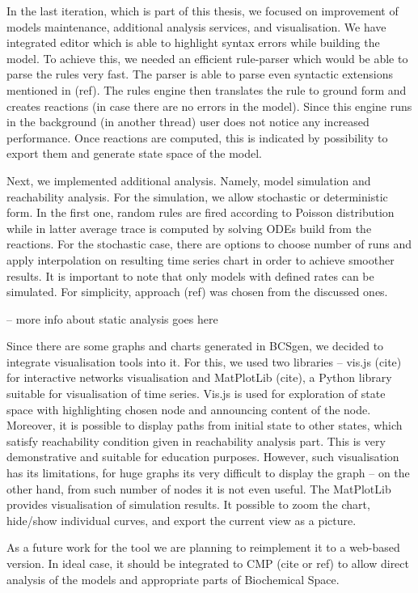 \documentclass[12pt]{fithesis2}
\begin{document}
In the last iteration, which is part of this thesis, we focused on improvement of models maintenance, additional analysis services, and visualisation. We have integrated editor which is able to highlight syntax errors while building the model. To achieve this, we needed an efficient rule-parser which would be able to parse the rules very fast. The parser is able to parse even syntactic extensions mentioned in (ref). The rules engine then translates the rule to ground form and creates reactions (in case there are no errors in the model). Since this engine runs in the background (in another thread) user does not notice any increased performance. Once reactions are computed, this is indicated by possibility to export them and generate state space of the model.

Next, we implemented additional analysis. Namely, model simulation and reachability analysis. For the simulation, we allow stochastic or deterministic form. In the first one, random rules are fired according to Poisson distribution while in latter average trace is computed by solving ODEs build from the reactions. For the stochastic case, there are options to choose number of runs and apply interpolation on resulting time series chart in order to achieve smoother results. It is important to note that only models with defined rates can be simulated. For simplicity, approach (ref) was chosen from the discussed ones.

 -- more info about static analysis goes here

Since there are some graphs and charts generated in BCSgen, we decided to integrate visualisation tools into it. For this, we used two libraries -- vis.js (cite) for interactive networks visualisation and MatPlotLib (cite), a Python library suitable for visualisation of time series. Vis.js is used for exploration of state space with highlighting chosen node and announcing content of the node. Moreover, it is possible to display paths from initial state to other states, which satisfy reachability condition given in reachability analysis part. This is very demonstrative and suitable for education purposes. However, such visualisation has its limitations, for huge graphs its very difficult to display the graph -- on the other hand, from such number of nodes it is not even useful. The MatPlotLib provides visualisation of simulation results. It possible to zoom the chart, hide/show individual curves, and export the current view as a picture.

As a future work for the tool we are planning to reimplement it to a web-based version. In ideal case, it should be integrated to CMP (cite or ref) to allow direct analysis of the models and appropriate parts of Biochemical Space.  
\end{document}
